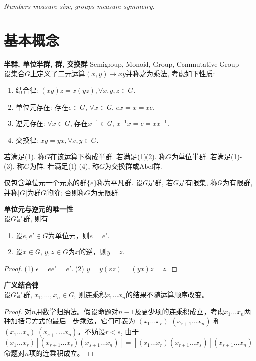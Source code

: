 
\par \emph{Numbers measure size, groups measure symmetry.} 
\par {}

\section{基本概念}

\begin{dfn} \textbf{半群, 单位半群, 群, 交换群} Semigroup, Monoid, Group, Commutative Group\\
设集合$G$上定义了二元运算$(x,y)\mapsto xy$并称之为乘法, 考虑如下性质: 
\begin{enumerate}
    \item 结合律: $(xy)z=x(yz), \forall x,y,z \in G$.
    \item 单位元存在: 存在$e\in G$, $\forall x \in G$, $ex=x=xe$.
    \item 逆元存在: $\forall x\in G$, 存在$x^{-1}\in G$, $x^{-1}x=e=xx^{-1}$.
    \item 交换律: $xy=yx, \forall x,y \in G$.
\end{enumerate}
若满足(1), 称$G$在该运算下构成半群. 若满足(1)(2), 称$G$为单位半群. 若满足(1)-(3), 称$G$为群. 若满足(1)-(4), 称$G$为交换群或Abel群. 
\end{dfn}
仅包含单位元一个元素的群$\{e\}$称为平凡群. 设$G$是群, 若$G$是有限集, 称$G$为有限群, 并称$\vert G\vert$为群$G$的阶; 否则称$G$为无限群. 

\begin{pro}
\textbf{单位元与逆元的唯一性}\\
设$G$是群, 则有
\begin{enumerate}
    \item 设$e,e'\in G$为单位元，则$e=e'$.
    \item 设$x \in G$, $y,z\in G$为$x$的逆，则$y=z$.
\end{enumerate}
\end{pro}
\begin{proof}
    (1) $e=ee'=e'$. (2) $y=y(xz)=(yx)z=z$.
\end{proof}

\begin{pro}
\textbf{广义结合律}\\
设$G$是群, $x_1,\dots,x_n\in G$, 则连乘积$x_1\dots x_n$的结果不随运算顺序改变。
\end{pro}
\begin{proof}
    对$n$用数学归纳法。假设命题对$n-1$及更少项的连乘积成立，考虑$x_1\dots x_n$两种加括号方式的最后一步乘法，它们可表为 $(x_1\dots x_r)$ $(x_{r+1}\dots x_n)$ 和 $(x_1\dots x_s)$ $(x_{s+1}\dots x_n)$。不妨设$r<s$, 由于
    \begin{equation}
        (x_1\dots x_r)[(x_{r+1}\dots x_s)(x_{s+1}\dots x_n)]=[(x_1\dots x_r)(x_{r+1}\dots x_s)](x_{s+1}\dots x_n)
    \end{equation}
    命题对$n$项的连乘积成立。
\end{proof}

